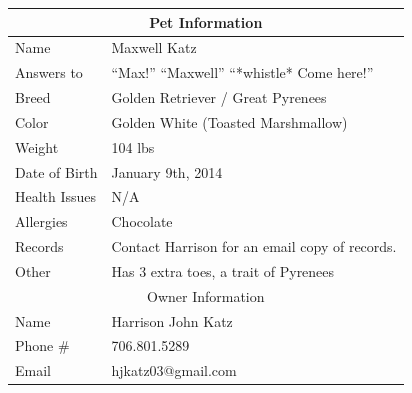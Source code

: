 \documentclass[pdftex,12pt]{article}
\begin{document}
\begin{table}[H]
    \begin{longtable}{@{}ll@{}}
        \toprule
        \multicolumn{2}{c}{Pet Information}                                                                                    \\ \midrule
        Name          & Maxwell Katz                                                                                           \\
        Answers to    & ``Max!'' ``Maxwell'' ``*whistle* Come here!''                                                                \\
        Breed         & Golden Retriever / Great Pyrenees                                                                      \\
        Color         & Golden White (Toasted Marshmallow)                                                                    \\
        Weight        & 104 lbs                                                                                                \\
        Date of Birth & January 9th, 2014                                                                                      \\
        Health Issues & N/A                                                                                                    \\
        Allergies     & Chocolate                                                                                              \\
        Records       & Contact Harrison for an email copy of records.                                                         \\
        Other         & Has 3 extra toes, a trait of Pyrenees                                                                  \\ \midrule
        \multicolumn{2}{c}{Owner Information}                                                                                  \\ \midrule
        Name          & Harrison John Katz                                                                                     \\
        Phone \#      & 706.801.5289                                                                                           \\
        Email         & hjkatz03@gmail.com                                                                                     \\ \midrule

\end{longtable}
\end{table}
\end{document}
